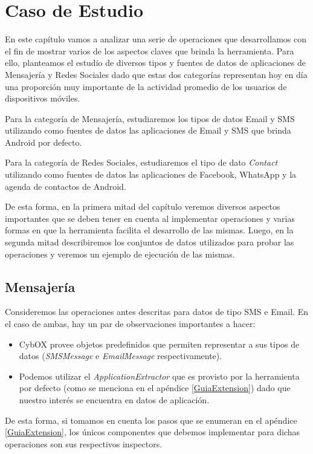 \chapter{Caso de Estudio}
\label{capCasoDeEstudio}
En este capítulo vamos a analizar una serie de operaciones que desarrollamos con el fin de mostrar varios de los aspectos claves que brinda la herramienta. Para ello, planteamos el estudio de diversos tipos y fuentes de datos de aplicaciones de Mensajería y Redes Sociales dado que estas dos categorías representan hoy en día una proporción muy importante de la actividad promedio de los usuarios de dispositivos móviles.

Para la categoría de Mensajería, estudiaremos los tipos de datos Email y SMS utilizando como fuentes de datos las aplicaciones de Email y SMS que brinda Android por defecto.

Para la categoría de Redes Sociales, estudiaremos el tipo de dato \emph{Contact} utilizando como fuentes de datos las aplicaciones de Facebook, WhatsApp y la agenda de contactos de Android.

De esta forma, en la primera mitad del capítulo veremos diversos aspectos importantes que se deben tener en cuenta al implementar operaciones y varias formas en que la herramienta facilita el desarrollo de las mismas. Luego, en la segunda mitad describiremos los conjuntos de datos utilizados para probar las operaciones y veremos un ejemplo de ejecución de las mismas.

\section{Mensajería}
Consideremos las operaciones antes descritas para datos de tipo SMS e Email. En el caso de ambas, hay un par de observaciones importantes a hacer:
\begin{itemize}
\item CybOX provee objetos predefinidos que permiten representar a sus tipos de datos (\emph{SMSMessage} e \emph{EmailMessage} respectivamente).
\item Podemos utilizar el \emph{ApplicationExtractor} que es provisto por la herramienta por defecto (como se menciona en el apéndice \ref{GuiaExtension}) dado que nuestro interés se encuentra en datos de aplicación.
\end{itemize}

De esta forma, si tomamos en cuenta los pasos que se enumeran en el apéndice \ref{GuiaExtension}, los únicos componentes que debemos implementar para dichas operaciones son sus respectivos inspectors.

